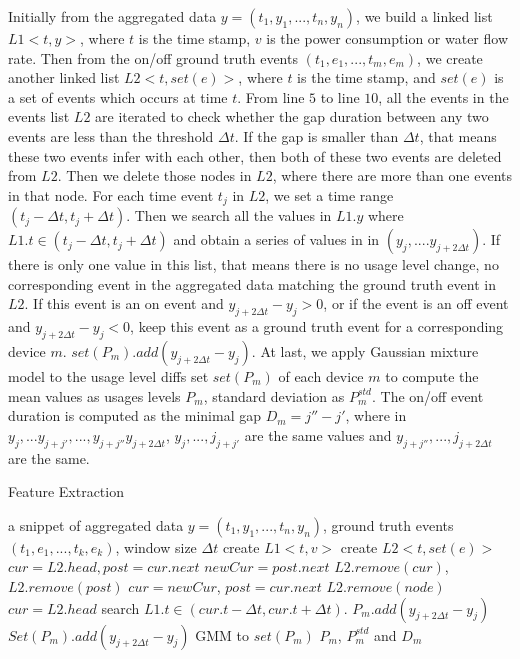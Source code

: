 Initially from the aggregated data $y=(t_1, y_1,..., t_n, y_n)$, we build 
a linked list $L1<t,y>$, where $t$ is the time stamp, 
$v$ is the power consumption or water flow rate. 
Then from the on/off ground truth events $(t_1, e_1, ..., t_m, e_m)$, 
we create another linked list $L2<t,set(e)>$, where 
$t$ is the time stamp, and $set(e)$ is a set of events which occurs at time $t$. 
From line $5$ to line $10$, 
all the events in the events list $L2$ are iterated to check 
whether the gap duration between any two events are less than the threshold $\Delta t$. 
If the gap is smaller than $\Delta t$, that means these two events 
infer with each other, then both of these two events are deleted from $L2$. 
Then we delete those nodes in $L2$, where there are more than one events in that node. 
For each time event $t_j$ in $L2$, we set a time range $(t_j-\Delta t, t_j+\Delta t)$. 
Then we search all the values in $L1.y$ where $L1.t \in (t_j-\Delta t, t_j+\Delta t)$
and obtain a series of values in in $(y_j, ....y_{j+2\Delta t})$. 
If there is only one value in this list, that means there is no usage level change, 
no corresponding event in the aggregated data matching the ground truth event in $L2$. 
If this event is an on event and $y_{j+2\Delta t} - y_j > 0$, or 
if the event is an off event and $y_{j+2\Delta t} - y_j < 0$, keep this event as a ground truth event for a corresponding device $m$. 
$set(P_{m}).add(y_{j+2\Delta t} - y_j)$.
At last, we apply Gaussian mixture model to the usage level diffs set $set(P_m)$ of each device $m$ 
to compute the mean values as usages levels $P_m$, 
standard deviation as $P_m^{std}$. 
The on/off event duration is computed as the minimal gap $D_m= j''- j' $, where in ${y_j , ...y_{j+j'},..., y_{j+j''} y_{j+2\Delta t}}$, 
$y_j, ..., j_{j+j'}$ are the same values and $y_{j+j''}, ..., j_{j+2\Delta t}$ are the same.

\begin{algorithm}
\caption{Feature Extraction}
\begin{algorithmic}[1] 
\label{alg_extractFeatures}
\REQUIRE a snippet of aggregated data $y= (t_1, y_1,...,t_n, y_n)$, ground truth events $(t_1, e_1, ..., t_k, e_k)$, 
window size $\Delta t$ 
\STATE create $L1<t, v>$
\STATE create $L2<t,set(e)>$
\STATE $cur=L2.head, post= cur.next$
\STATE $newCur=post.next$
\STATE $L2.remove(cur)$, $L2.remove(post)$
\STATE $cur= newCur$, $post=cur.next$
\ENDIF
\ENDWHILE
{}
\STATE $L2.remove(node)$
\ENDWHILE
\STATE $cur=L2.head$
\STATE search $L1.t \in (cur.t-\Delta t, cur.t+\Delta t)$. 
\STATE $P_{m}.add(y_{j+2\Delta t} - y_j)$
\ENDIF
{}
\STATE $Set(P_{m}).add(y_{j+2\Delta t} - y_j)$
\ENDIF
\ENDWHILE
\STATE GMM to $set(P_m)$
\RETURN $P_m$, $P_m^{std}$ and $D_m$
\end{algorithmic}
\end{algorithm}

